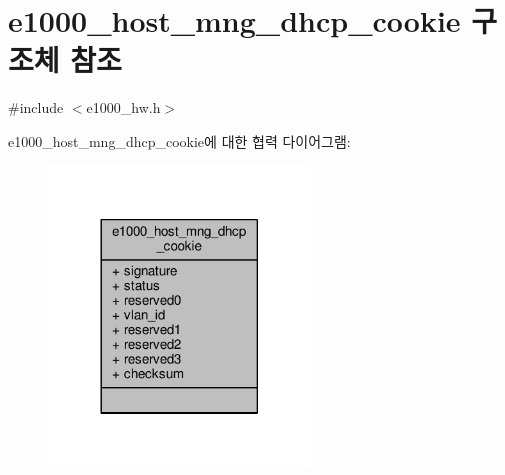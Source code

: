 \hypertarget{structe1000__host__mng__dhcp__cookie}{}\section{e1000\+\_\+host\+\_\+mng\+\_\+dhcp\+\_\+cookie 구조체 참조}
\label{structe1000__host__mng__dhcp__cookie}


{\ttfamily \#include $<$e1000\+\_\+hw.\+h$>$}



e1000\+\_\+host\+\_\+mng\+\_\+dhcp\+\_\+cookie에 대한 협력 다이어그램\+:
\nopagebreak
\begin{figure}[H]
\begin{center}
\leavevmode
\includegraphics[width=197pt]{structe1000__host__mng__dhcp__cookie__coll__graph}
\end{center}
\end{figure}
